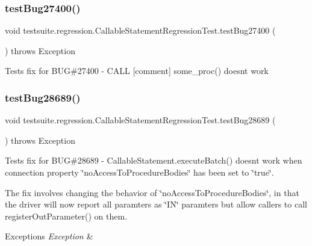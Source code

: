 \subsubsection{\texorpdfstring{test\+Bug27400()}{testBug27400()}}
{\footnotesize\ttfamily void testsuite.\+regression.\+Callable\+Statement\+Regression\+Test.\+test\+Bug27400 (\begin{DoxyParamCaption}{ }\end{DoxyParamCaption}) throws Exception}

Tests fix for B\+UG\#27400 -\/ C\+A\+LL \mbox{[}comment\mbox{]} some\+\_\+proc() doesn\textquotesingle{}t work \mbox{\label{classtestsuite_1_1regression_1_1_callable_statement_regression_test_ad52f0f9cf573c237f9b51732bcb429e8}} 
\subsubsection{\texorpdfstring{test\+Bug28689()}{testBug28689()}}
{\footnotesize\ttfamily void testsuite.\+regression.\+Callable\+Statement\+Regression\+Test.\+test\+Bug28689 (\begin{DoxyParamCaption}{ }\end{DoxyParamCaption}) throws Exception}

Tests fix for B\+UG\#28689 -\/ Callable\+Statement.\+execute\+Batch() doesn\textquotesingle{}t work when connection property \char`\"{}no\+Access\+To\+Procedure\+Bodies\char`\"{} has been set to \char`\"{}true\char`\"{}.

The fix involves changing the behavior of \char`\"{}no\+Access\+To\+Procedure\+Bodies\char`\"{}, in that the driver will now report all paramters as \char`\"{}\+I\+N\char`\"{} paramters but allow callers to call register\+Out\+Parameter() on them.


\begin{DoxyExceptions}{Exceptions}
{\em Exception} & \\
\hline
\end{DoxyExceptions}
\mbox{\label{classtestsuite_1_1regression_1_1_callable_statement_regression_test_a28a91e6259cced18e90ef08947170c38}} 
